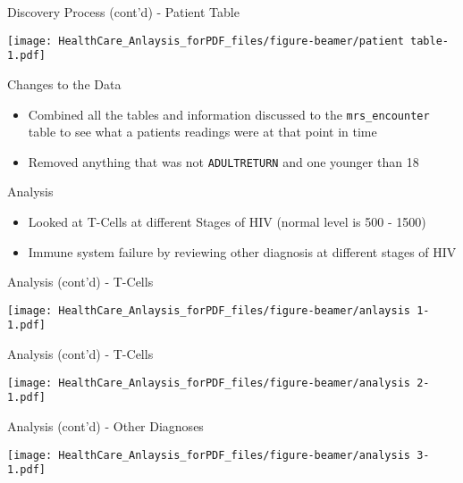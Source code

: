 \documentclass[ignorenonframetext,]{beamer}
\providecommand{\tightlist}{%
\setlength{\itemsep}{0pt}\setlength{\parskip}{0pt}}
\begin{document}
\begin{frame}{Discovery Process (cont'd) - Patient Table}

\texttt{[image: HealthCare\_Anlaysis\_forPDF\_files/figure-beamer/patient table-1.pdf]}

\end{frame}

\begin{frame}[fragile]{Changes to the Data}

\begin{itemize}
\tightlist
\item
  Combined all the tables and information discussed to the
  \texttt{mrs\_encounter} table to see what a patients readings were at
  that point in time
\item
  Removed anything that was not \texttt{ADULTRETURN} and one younger
  than 18
\end{itemize}

\end{frame}

\begin{frame}{Analysis}

\begin{itemize}
\tightlist
\item
  Looked at T-Cells at different Stages of HIV (normal level is 500 -
  1500)
\item
  Immune system failure by reviewing other diagnosis at different stages
  of HIV
\end{itemize}

\end{frame}

\begin{frame}{Analysis (cont'd) - T-Cells}

\texttt{[image: HealthCare\_Anlaysis\_forPDF\_files/figure-beamer/anlaysis 1-1.pdf]}

\end{frame}

\begin{frame}{Analysis (cont'd) - T-Cells}

\texttt{[image: HealthCare\_Anlaysis\_forPDF\_files/figure-beamer/analysis 2-1.pdf]}

\end{frame}

\begin{frame}{Analysis (cont'd) - Other Diagnoses}

\texttt{[image: HealthCare\_Anlaysis\_forPDF\_files/figure-beamer/analysis 3-1.pdf]}

\end{frame}
\end{document}
